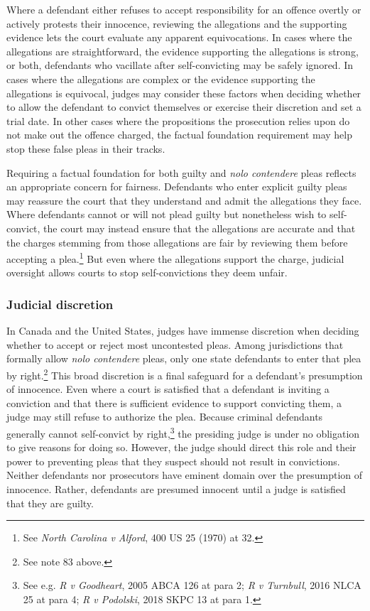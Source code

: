 Where a defendant either refuses to accept responsibility for an offence overtly or actively protests their innocence, reviewing the allegations and the supporting evidence lets the court evaluate any apparent equivocations. In cases where the allegations are straightforward, the evidence supporting the allegations is strong, or both, defendants who vacillate after self-convicting may be safely ignored. In cases where the allegations are complex or the evidence supporting the allegations is equivocal, judges may consider these factors when deciding whether to allow the defendant to convict themselves or exercise their discretion and set a trial date. In other cases where the propositions the prosecution relies upon do not make out the offence charged, the factual foundation requirement may help stop these false pleas in their tracks.

Requiring a factual foundation for both guilty and \textit{nolo contendere} pleas reflects an appropriate concern for fairness. Defendants who enter explicit guilty pleas may reassure the court that they understand and admit the allegations they face. Where defendants cannot or will not plead guilty but nonetheless wish to self-convict, the court may instead ensure that the allegations are accurate and that the charges stemming from those allegations are fair by reviewing them before accepting a plea.\footnote{See \textit{North Carolina v Alford}, 400 US 25 (1970) at 32.} But even where the allegations support the charge, judicial oversight allows courts to stop self-convictions they deem unfair.

\subsubsection{Judicial discretion}

In Canada and the United States, judges have immense discretion when deciding whether to accept or reject most uncontested pleas. Among jurisdictions that formally allow \textit{nolo contendere} pleas, only one state defendants to enter that plea by right.\footnote{See note 83 above.} This broad discretion is a final safeguard for a defendant's presumption of innocence. Even where a court is satisfied that a defendant is inviting a conviction and that there is sufficient evidence to support convicting them, a judge may still refuse to authorize the plea. Because criminal defendants generally cannot self-convict by right,\footnote{See e.g. \textit{R v Goodheart}, 2005 ABCA 126 at para 2; \textit{R v Turnbull}, 2016 NLCA 25 at para 4; \textit{R v Podolski}, 2018 SKPC 13 at para 1.} the presiding judge is under no obligation to give reasons for doing so. However, the judge should direct this role and their power to preventing pleas that they suspect should not result in convictions. Neither defendants nor prosecutors have eminent domain over the presumption of innocence. Rather, defendants are presumed innocent until a judge is satisfied that they are guilty.

